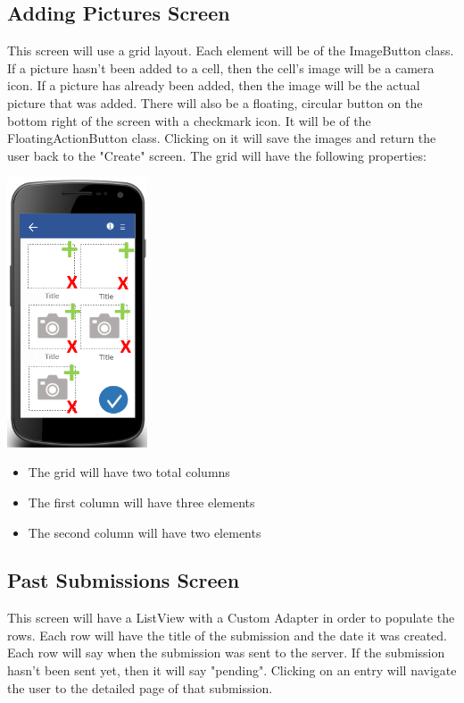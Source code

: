 \documentclass[onecolumn, draftclsnofoot, article, 10pt, compsoc]{IEEEtran}
\begin{document}
\subsection{Adding Pictures Screen}
This screen will use a grid layout. Each element will be of the ImageButton class. If a picture hasn't been added to a cell, then the cell's image will be a camera icon. If a picture has already been added, then the image will be the actual picture that was added. There will also be a floating, circular button on the bottom right of the screen with a checkmark icon. It will be of the FloatingActionButton class. Clicking on it will save the images and return the user back to the "Create" screen. The grid will have the following properties:
\newline
\begin{center}
\includegraphics[height=8cm]{picturesscreen.png}
\end{center}

\begin{itemize}
\item The grid will have two total columns
\item The first column will have three elements
\item The second column will have two elements
\end{itemize}

\subsection{Past Submissions Screen}
This screen will have a ListView with a Custom Adapter in order to populate the rows. Each row will have the title of the submission and the date it was created. Each row will say when the submission was sent to the server. If the submission hasn't been sent yet, then it will say "pending". Clicking on an entry will navigate the user to the detailed page of that submission.
\end{document}
